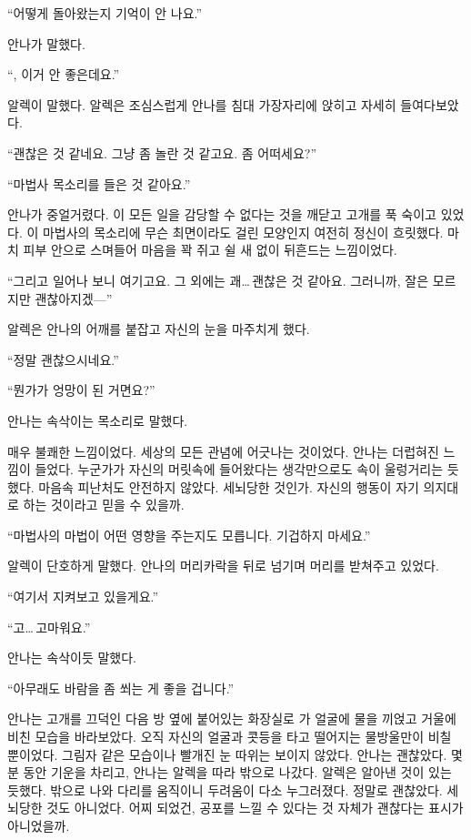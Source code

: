 ``어떻게 돌아왔는지 기억이 안 나요.''

안나가 말했다.

``, 이거 안 좋은데요.''

알렉이 말했다. 알렉은 조심스럽게 안나를 침대 가장자리에 앉히고 자세히 들여다보았다.

``괜찮은 것 같네요. 그냥 좀 놀란 것 같고요. 좀 어떠세요?''

``마법사 목소리를 들은 것 같아요.''

안나가 중얼거렸다. 이 모든 일을 감당할 수 없다는 것을 깨닫고 고개를 푹 숙이고 있었다. 이 마법사의 목소리에 무슨 최면이라도 걸린 모양인지 여전히 정신이 흐릿했다. 마치 피부 안으로 스며들어 마음을 꽉 쥐고 쉴 새 없이 뒤흔드는 느낌이었다.

``그리고 일어나 보니 여기고요. 그 외에는 괘\ldots\,괜찮은 것 같아요. 그러니까, 잘은 모르지만 괜찮아지겠—''

알렉은 안나의 어깨를 붙잡고 자신의 눈을 마주치게 했다.

``정말 괜찮으시네요.''

``뭔가가 엉망이 된 거면요?''

안나는 속삭이는 목소리로 말했다.

매우 불쾌한 느낌이었다. 세상의 모든 관념에 어긋나는 것이었다. 안나는 더럽혀진 느낌이 들었다. 누군가가 자신의 머릿속에 들어왔다는 생각만으로도 속이 울렁거리는 듯했다. 마음속 피난처도 안전하지 않았다. 세뇌당한 것인가. 자신의 행동이 자기 의지대로 하는 것이라고 믿을 수 있을까.

``마법사의 마법이 어떤 영향을 주는지도 모릅니다. 기겁하지 마세요.''

알렉이 단호하게 말했다. 안나의 머리카락을 뒤로 넘기며 머리를 받쳐주고 있었다.

``여기서 지켜보고 있을게요.''

``고\ldots\,고마워요.''

안나는 속삭이듯 말했다.

``아무래도 바람을 좀 쐬는 게 좋을 겁니다.''

안나는 고개를 끄덕인 다음 방 옆에 붙어있는 화장실로 가 얼굴에 물을 끼얹고 거울에 비친 모습을 바라보았다. 오직 자신의 얼굴과 콧등을 타고 떨어지는 물방울만이 비칠 뿐이었다. 그림자 같은 모습이나 빨개진 눈 따위는 보이지 않았다. 안나는 괜찮았다. 몇 분 동안 기운을 차리고, 안나는 알렉을 따라 밖으로 나갔다. 알렉은 알아낸 것이 있는 듯했다. 밖으로 나와 다리를 움직이니 두려움이 다소 누그러졌다. 정말로 괜찮았다. 세뇌당한 것도 아니었다. 어찌 되었건, 공포를 느낄 수 있다는 것 자체가 괜찮다는 표시가 아니었을까.

